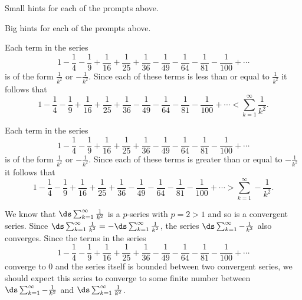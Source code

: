\begin{smallhint}
\ba
	\item Small hints for each of the prompts above.
\ea
\end{smallhint}
\begin{bighint}
\ba
	\item Big hints for each of the prompts above.
\ea
\end{bighint}
\begin{activitySolution}
\ba
	\item Each term in the series 
\[1 - \frac{1}{4} - \frac{1}{9} + \frac{1}{16} + \frac{1}{25} + \frac{1}{36} - \frac{1}{49}  - \frac{1}{64}  - \frac{1}{81}  - \frac{1}{100}  + \cdots\]
is of the form $\frac{1}{k^2}$ or $-\frac{1}{k^2}$. Since each of these terms is less than or equal to $\frac{1}{k^2}$ it follows that 
\[1 - \frac{1}{4} - \frac{1}{9} + \frac{1}{16} + \frac{1}{25} + \frac{1}{36} - \frac{1}{49}  - \frac{1}{64}  - \frac{1}{81}  - \frac{1}{100}  + \cdots < \sum_{k=1}^{\infty} \frac{1}{k^2}.\]

    \item Each term in the series
\[1 - \frac{1}{4} - \frac{1}{9} + \frac{1}{16} + \frac{1}{25} + \frac{1}{36} - \frac{1}{49}  - \frac{1}{64}  - \frac{1}{81}  - \frac{1}{100}  + \cdots\]
is of the form $\frac{1}{k^2}$ or $-\frac{1}{k^2}$. Since each of these terms is greater than or equal to $-\frac{1}{k^2}$ it follows that
\[1 - \frac{1}{4} - \frac{1}{9} + \frac{1}{16} + \frac{1}{25} + \frac{1}{36} - \frac{1}{49}  - \frac{1}{64}  - \frac{1}{81}  - \frac{1}{100}  + \cdots > \sum_{k=1}^{\infty} -\frac{1}{k^2}.\]

    \item We know that $\ds \sum_{k=1}^{\infty} \frac{1}{k^2}$ is a $p$-series with $p = 2 > 1$ and so is a convergent series. Since $\ds \sum_{k=1}^{\infty} \frac{1}{k^2} = -\ds \sum_{k=1}^{\infty} \frac{1}{k^2}$, the series $\ds \sum_{k=1}^{\infty} -\frac{1}{k^2}$ also converges. Since the terms in the series 
\[1 - \frac{1}{4} - \frac{1}{9} + \frac{1}{16} + \frac{1}{25} + \frac{1}{36} - \frac{1}{49}  - \frac{1}{64}  - \frac{1}{81}  - \frac{1}{100}  + \cdots\]
converge to 0 and the series itself is bounded between two convergent series, we should expect this series to converge to some finite number between $\ds \sum_{k=1}^{\infty} -\frac{1}{k^2}$ and $\ds \sum_{k=1}^{\infty} \frac{1}{k^2}$.
\ea
\end{activitySolution}
\aftera 